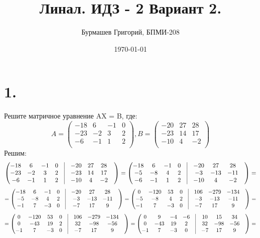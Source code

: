 \documentclass[a4paper,12pt]{article}
\author{Бурмашев Григорий, БПМИ-208}
\title{Линал. ИДЗ - 2 Вариант 2.}
\date{\today}
\begin{document}
\maketitle
\newpage
\section*{1.}
Решите матричное уравнение AX = B, где:
\[
A = \begin{pmatrix}
-18 & 6 & -1 & 0\\
-23 & -2 & 3 & 2\\
-6 & -1 & 1& 2\\
\end{pmatrix},
B = \begin{pmatrix}
-20 & 27 & 28 \\
-23 & 14 & 17\\
-10 & 4 & -2\\
\end{pmatrix}
\]
Решим:
\[
\begin{pmatrix}
-18 & 6 & -1 & 0 & \vrule &-20 & 27 & 28 & \\
-23 & -2 & 3 & 2 & \vrule &-23 & 14 & 17 & \\
-6 & -1 & 1 & 2 & \vrule &-10 & 4 & -2 & \\
\end{pmatrix} = \begin{pmatrix}
-18 & 6 & -1 & 0 & \vrule &-20 & 27 & 28 & \\
-5 & -8 & 4 & 2 & \vrule &-3 & -13 & -11 & \\
-6 & -1 & 1 & 2 & \vrule &-10 & 4 & -2 & \\
\end{pmatrix} = 
\]
\[
= \begin{pmatrix}
-18 & 6 & -1 & 0 & \vrule &-20 & 27 & 28 & \\
-5 & -8 & 4 & 2 & \vrule &-3 & -13 & -11 & \\
-1 & 7 & -3 & 0 & \vrule &-7 & 17 & 9 & \\
\end{pmatrix} = \begin{pmatrix}
0 & -120 & 53 & 0 & \vrule &106 & -279 & -134 & \\
-5 & -8 & 4 & 2 & \vrule &-3 & -13 & -11 & \\
-1 & 7 & -3 & 0 & \vrule &-7 & 17 & 9 & \\
\end{pmatrix}= 
\]
\[
= 
\begin{pmatrix}
0 & -120 & 53 & 0 & \vrule &106 & -279 & -134 & \\
0 & -43 & 19 & 2 & \vrule &32 & -98 & -56 & \\
-1 & 7 & -3 & 0 & \vrule &-7 & 17 & 9 & \\
\end{pmatrix} = \begin{pmatrix}
0 & 9 & -4 & -6 & \vrule &10 & 15 & 34 & \\
0 & -43 & 19 & 2 & \vrule &32 & -98 & -56 & \\
-1 & 7 & -3 & 0 & \vrule &-7 & 17 & 9 & \\
\end{pmatrix} = 
\]
\end{document}

